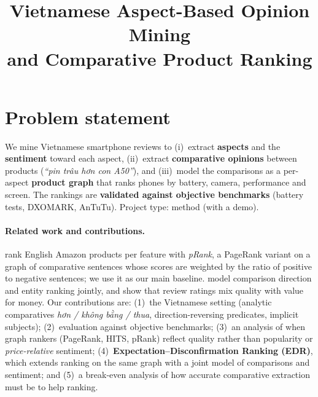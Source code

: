 \documentclass{article}
\title{Vietnamese Aspect-Based Opinion Mining\\and Comparative Product Ranking}
\author{\groupauthors}
\begin{document}
\maketitle
{}
\vspace{-14pt}

\section{Problem statement}
We mine Vietnamese smartphone reviews to
(i)~extract \textbf{aspects} and the \textbf{sentiment} toward each aspect,
(ii)~extract \textbf{comparative opinions} between products (\emph{``pin trâu hơn con A50''}), and
(iii)~model the comparisons as a per-aspect \textbf{product graph} that ranks phones by battery, camera, performance and screen.
The rankings are \textbf{validated against objective benchmarks} (battery tests, DXOMARK, AnTuTu).
Project type: method (with a demo).

\begin{center}\pipeline\end{center}
\vspace{-6pt}

\paragraph{Related work and contributions.} \citet{zhang2010} rank English Amazon products per feature with \emph{pRank}, a PageRank
variant on a graph of comparative sentences whose scores are weighted by the ratio of positive to negative sentences; we use it as our main baseline.
\citet{tkachenko2014} model comparison direction and entity ranking jointly, and \citet{lihitt2010} show that review ratings mix quality with
value for money. Our contributions are:
(1)~the Vietnamese setting (analytic comparatives \emph{hơn / không bằng / thua}, direction-reversing predicates, implicit subjects);
(2)~evaluation against objective benchmarks;
(3)~an analysis of when graph rankers (PageRank, HITS, pRank) reflect quality rather than popularity or \emph{price-relative} sentiment;
(4)~\textbf{Expectation--Disconfirmation Ranking (EDR)}, which extends ranking on the same graph with a joint model of comparisons and sentiment; and
(5)~a break-even analysis of how accurate comparative extraction must be to help ranking.

\end{document}
